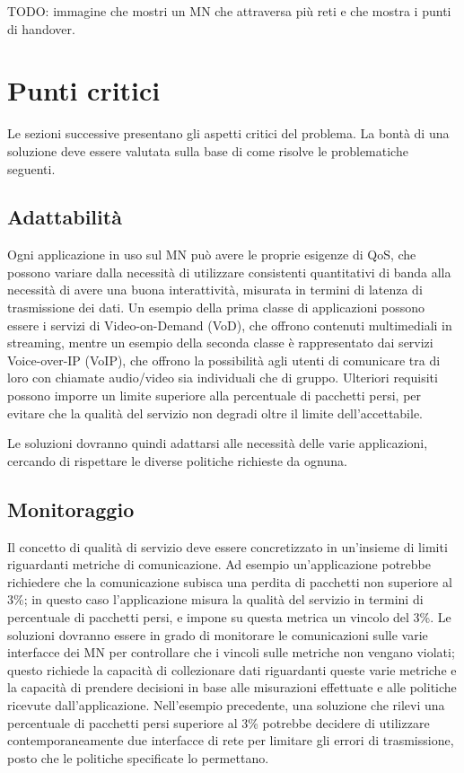 \documentclass[12pt,a4paper,openright,twoside]{book}
\begin{document}
TODO: immagine che mostri un MN che attraversa più reti e che mostra i
punti di handover.

\section{Punti critici}
\label{sec:punti-critici}
Le sezioni successive presentano gli aspetti critici del problema. La
bontà di una soluzione deve essere valutata sulla base di come risolve
le problematiche seguenti.

\subsection{Adattabilità}
Ogni applicazione in uso sul MN può avere le proprie esigenze di QoS,
che possono variare dalla necessità di utilizzare consistenti
quantitativi di banda alla necessità di avere una buona interattività,
misurata in termini di latenza di trasmissione dei dati. Un esempio
della prima classe di applicazioni possono essere i servizi di
Video-on-Demand (VoD), che offrono contenuti multimediali in
streaming, mentre un esempio della seconda classe è rappresentato dai
servizi Voice-over-IP (VoIP), che offrono la possibilità agli utenti
di comunicare tra di loro con chiamate audio/video sia individuali che
di gruppo. Ulteriori requisiti possono imporre un limite superiore
alla percentuale di pacchetti persi, per evitare che la qualità del
servizio non degradi oltre il limite dell'accettabile.

Le soluzioni dovranno quindi adattarsi alle necessità delle varie
applicazioni, cercando di rispettare le diverse politiche richieste da
ognuna.

\subsection{Monitoraggio}
Il concetto di qualità di servizio deve essere concretizzato in
un'insieme di limiti riguardanti metriche di comunicazione. Ad esempio
un'applicazione potrebbe richiedere che la comunicazione subisca una
perdita di pacchetti non superiore al 3\%; in questo caso
l'applicazione misura la qualità del servizio in termini di
percentuale di pacchetti persi, e impone su questa metrica un vincolo
del 3\%. Le soluzioni dovranno essere in grado di monitorare le
comunicazioni sulle varie interfacce dei MN per controllare che i
vincoli sulle metriche non vengano violati; questo richiede la
capacità di collezionare dati riguardanti queste varie metriche e la
capacità di prendere decisioni in base alle misurazioni effettuate e
alle politiche ricevute dall'applicazione. Nell'esempio precedente,
una soluzione che rilevi una percentuale di pacchetti persi superiore
al 3\% potrebbe decidere di utilizzare contemporaneamente due
interfacce di rete per limitare gli errori di trasmissione, posto che
le politiche specificate lo permettano.
\end{document}

